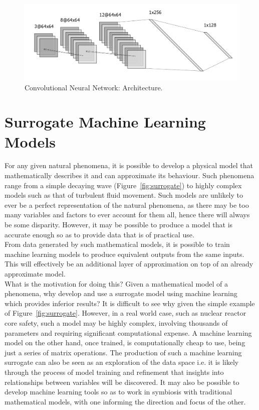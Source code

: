 \begin{figure}[p]
	\centering
	\includegraphics[scale=0.45]{Figures/cnn_arch.png}
	\caption{Convolutional Neural Network: Architecture.}
	\label{fig:cnn}
\end{figure}

\section{Surrogate Machine Learning Models} \label{Surrogate}

For any given natural phenomena, it is possible to develop a physical model that mathematically describes it and can approximate its behaviour. Such phenomena range from a simple decaying wave (Figure~\ref{fig:surrogate}) to highly complex models such as that of turbulent fluid movement. Such models are unlikely to ever be a perfect representation of the natural phenomena, as there may be too many variables and factors to ever account for them all, hence there will always be some disparity. However, it may be possible to produce a model that is accurate enough so as to provide data that is of practical use.
\\

\noindent
From  data generated by such mathematical models, it is possible to train machine learning models to produce equivalent outputs from the same inputs. This will effectively be an additional layer of approximation on top of an already approximate model.
\\

\noindent
What is the motivation for doing this? Given a mathematical model of a phenomena, why develop and use a surrogate model using machine learning which provides inferior results? It is difficult to see why given the simple example of Figure~\ref{fig:surrogate}. However, in a real world case, such as nuclear reactor core safety, such a model may be highly complex, involving thousands of parameters and requiring significant computational expense. A machine learning model on the other hand, once trained, is computationally cheap to use, being just a series of matrix operations. The production of such a machine learning surrogate can also be seen as an exploration of the data space i.e. it is likely through the process of model training and refinement that insights into relationships between variables will be discovered. It may also be possible to develop machine learning tools so as to work in symbiosis with traditional mathematical models, with one informing the direction and focus of the other.
\\

